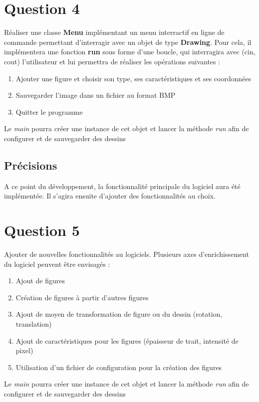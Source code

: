 \documentclass[
	12pt, %
]{fphw}
\begin{document}

\section*{Question 4}

\begin{problem}
	Réaliser une classe \textbf{Menu} implémentant un menu interractif en ligne de commande permettant d'interragir avec un objet de type \textbf{Drawing}.
	Pour cela, il implémentera une fonction \textbf{run} sous forme d'une boucle, qui interragira avec (cin, cout) l'utilisateur et lui permettra de réaliser les opérations suivantes :
	\begin{enumerate}
		\item Ajouter une figure et choisir son type, ses caractéristiques et ses coordonnées
		\item Sauvegarder l'image dans un fichier au format BMP
		\item Quitter le programme
	\end{enumerate}

	Le \emph{main} pourra créer une instance de cet objet et lancer la méthode \emph{run} afin de configurer et de sauvegarder des dessins
\end{problem}


\subsection*{Précisions}

A ce point du développement, la fonctionnalité principale du logiciel aura été implémentée. Il s'agira ensuite d'ajouter des fonctionnalités au choix.


\section*{Question 5}

\begin{problem}
	Ajouter de nouvelles fonctionnalités au logiciels. Plusieurs axes d'enrichissement du logiciel peuvent être envisagés :
	\begin{enumerate}
		\item Ajout de figures
		\item Création de figures à partir d'autres figures
		\item Ajout de moyen de transformation de figure ou du dessin (rotation, translation)
		\item Ajout de caractéristiques pour les figures (épaisseur de trait, intensité de pixel)
		\item Utilisation d'un fichier de configuration pour la création des figures
	\end{enumerate}

	Le \emph{main} pourra créer une instance de cet objet et lancer la méthode \emph{run} afin de configurer et de sauvegarder des dessins
\end{problem}
\end{document}
